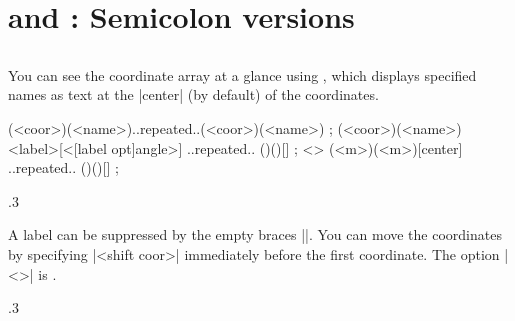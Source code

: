\section{\protect\cmd{\tzcoorsquick} and \protect\cmd{\tzcoorsquick*}: Semicolon versions}
\label{s:tzcoorsquick}

\subsection{\protect\cmd{\tzcoorsquick}}
\label{ss:tzcoorsquick}

You can see the coordinate array at a glance using \icmd{\tzcoorsquick}, which displays specified names as text at the |center| (by default) of the coordinates.

\begin{tzdef}{}
\tzcoorsquick(<coor>)(<name>)..repeated..(<coor>)(<name>) ;
(<coor>)(<name>){<label>}[<[label opt]angle>]
                                     ..repeated.. ()(){}[] ;
  <> (<m>)(<m>){}[center] ..repeated.. ()(){}[] ;
\end{tzdef}

\begin{tzcode}{.3}
{}
\end{tzcode}

A label can be suppressed by the empty braces |{}|.
You can move the coordinates by specifying |<shift coor>| immediately before the first coordinate. The  option |<>| is .

\begin{tzcode}{.3}
\end{tzcode}


\subsection{\protect\cmd{\tzcoorsquick*}}
\label{ss:tzcoorsquick*}

